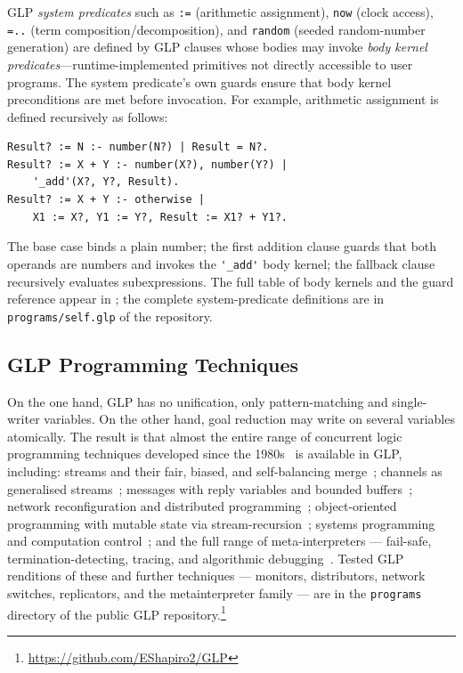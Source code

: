 GLP \emph{system predicates} such as \verb|:=| (arithmetic assignment), \verb|now| (clock access), \verb|=..| (term composition/decomposition), and \verb|random| (seeded random-number generation) are defined by GLP clauses whose bodies may invoke \emph{body kernel predicates}---runtime-implemented primitives not directly accessible to user programs. The system predicate's own guards ensure that body kernel preconditions are met before invocation. For example, arithmetic assignment is defined recursively as follows:

\begin{verbatim}
Result? := N :- number(N?) | Result = N?.
Result? := X + Y :- number(X?), number(Y?) |
    '_add'(X?, Y?, Result).
Result? := X + Y :- otherwise |
    X1 := X?, Y1 := Y?, Result := X1? + Y1?.
\end{verbatim}
\noindent The base case binds a plain number; the first addition clause guards that both operands are numbers and invokes the \verb|'_add'| body kernel; the fallback clause recursively evaluates subexpressions. The full table of body kernels and the guard reference appear in ; the complete system-predicate definitions are in \verb|programs/self.glp| of the repository.

\subsection{GLP Programming Techniques}

On the one hand, GLP has no unification, only pattern-matching and single-writer variables. On the other hand, goal reduction may write on several variables atomically. The result is that almost the entire range of concurrent logic programming techniques developed since the 1980s~\cite{shapiro1989family,shapiro1987concurrent} is available in GLP, including: streams and their fair, biased, and self-balancing merge~\cite{shapiro1984fair,shapiro1986multiway}; channels as generalised streams~\cite{tribble1988channels}; messages with reply variables and bounded buffers~\cite{takeuchi1988bounded}; network reconfiguration and distributed programming~\cite{shafrir1988distributed}; object-oriented programming with mutable state via stream-recursion~\cite{shapiro1983object}; systems programming and computation control~\cite{shapiro1984systems,silverman1988logix}; and the full range of meta-interpreters --- fail-safe, termination-detecting, tracing, and algorithmic debugging~\cite{safra1988meta,lichtenstein1988concurrent}. Tested GLP renditions of these and further techniques --- monitors, distributors, network switches, replicators, and the metainterpreter family --- are in the \verb|programs| directory of the public GLP repository.\footnote{\url{https://github.com/EShapiro2/GLP}}

